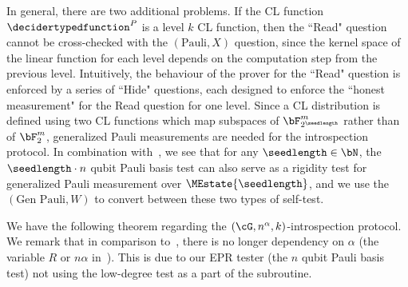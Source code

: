 In general, there are two additional problems. If the CL function $\decidertypedfunction^{P}$ is a level $k$ CL function, then the ``Read" question cannot be cross-checked with the $(\text{Pauli}, X)$ question, since the kernel space of the linear function for each level depends on the computation step from the previous level. Intuitively, the behaviour of the prover for the ``Read" question is enforced by a series of ``Hide" questions, each designed to enforce the ``honest measurement" for the Read question for one level. Since a CL distribution is defined using two CL functions which map subspaces of $\bF_{2^{\seedlength}}^m$ rather than of $\bF_2^m$, generalized Pauli measurements are needed for the introspection protocol. In combination with~, we see that for any $\seedlength \in \bN$, the $\seedlength \cdot n$ qubit Pauli basis test can also serve as a rigidity test for generalized Pauli measurement over $\MEstate{\seedlength}$, and we use the $(\text{Gen Pauli}, W)$ to convert between these two types of self-test.

We have the following theorem regarding the $(\cG,n^\alpha, k)$-introspection protocol. We remark that in comparison to~\cite[Theorem 8.3]{jiMIPRE2022a}, there is no longer dependency on $\alpha$ (the variable $R$ or $n \alpha$ in~\cite{jiMIPRE2022a}). This is due to our EPR tester (the $n$ qubit Pauli basis test) not using the low-degree test as a part of the subroutine. 

